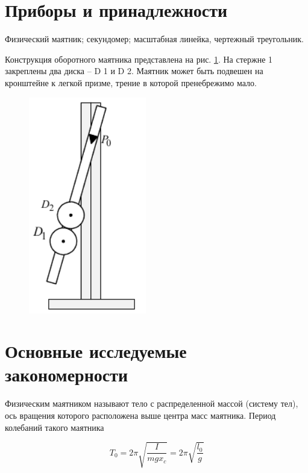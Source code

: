 \documentclass[12pt,a4paper]{article}%
\begin{document}
\section*{Приборы и принадлежности}
Физический маятник;
секундомер; масштабная линейка, чертежный треугольник.

Конструкция оборотного маятника представлена на
рис. \ref{1}. На стержне 1 закреплены два диска – D 1 и D 2. 
Маятник может быть подвешен на кронштейне к легкой
призме, трение в которой пренебрежимо мало.

\begin{figure}[h!]
	\centering
	\includegraphics[width=0.5\linewidth]{pic/1}
	\caption{}
	\label{1}
\end{figure}

\newpage

\section*{Основные исследуемые закономерности}

Физическим маятником называют тело с распределенной массой (систему
тел), ось вращения которого расположена выше центра масс маятника. 
Период колебаний такого маятника

\begin{equation}
T_{0} = 2\pi\sqrt{\dfrac{I}{mgx_{c}}} = 2\pi\sqrt{\dfrac{l_{0}}{g}}
\label{f1}
\end{equation}
\end{document}
